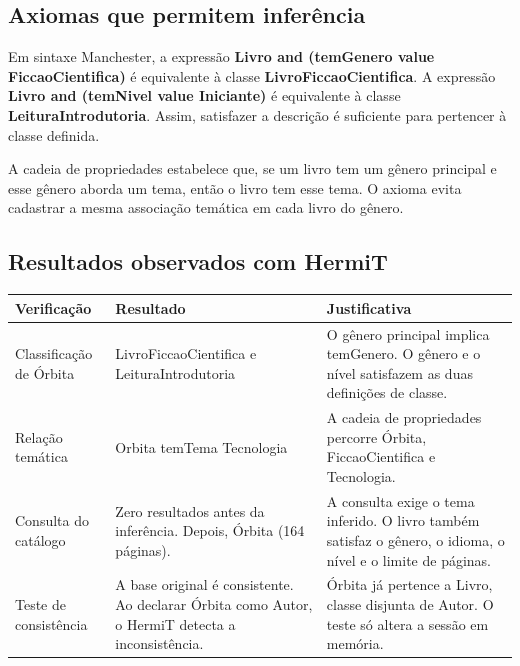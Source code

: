 \documentclass[12pt,a4paper]{article}
\begin{document}
\subsection{Axiomas que permitem inferência}

Em sintaxe Manchester, a expressão \textbf{Livro and (temGenero value FiccaoCientifica)} é equivalente à classe \textbf{LivroFiccaoCientifica}. A expressão \textbf{Livro and (temNivel value Iniciante)} é equivalente à classe \textbf{LeituraIntrodutoria}. Assim, satisfazer a descrição é suficiente para pertencer à classe definida.

A cadeia de propriedades estabelece que, se um livro tem um gênero principal e esse gênero aborda um tema, então o livro tem esse tema. O axioma evita cadastrar a mesma associação temática em cada livro do gênero.

\subsection{Resultados observados com HermiT}

\begin{table}[H]
    \centering
    \begin{tabular}{>{\raggedright\arraybackslash}p{3.6cm} >{\raggedright\arraybackslash}p{4.6cm} >{\raggedright\arraybackslash}p{6.2cm}}
        \toprule
        \textbf{Verificação} & \textbf{Resultado} & \textbf{Justificativa} \\
        \midrule
        Classificação de Órbita & LivroFiccaoCientifica e LeituraIntrodutoria & O gênero principal implica temGenero. O gênero e o nível satisfazem as duas definições de classe. \\
        \addlinespace
        Relação temática & Orbita temTema Tecnologia & A cadeia de propriedades percorre Órbita, FiccaoCientifica e Tecnologia. \\
        \addlinespace
        Consulta do catálogo & Zero resultados antes da inferência. Depois, Órbita (164 páginas). & A consulta exige o tema inferido. O livro também satisfaz o gênero, o idioma, o nível e o limite de páginas. \\
        \addlinespace
        Teste de consistência & A base original é consistente. Ao declarar Órbita como Autor, o HermiT detecta a inconsistência. & Órbita já pertence a Livro, classe disjunta de Autor. O teste só altera a sessão em memória. \\
        \bottomrule
    \end{tabular}
\end{table}
\end{document}
